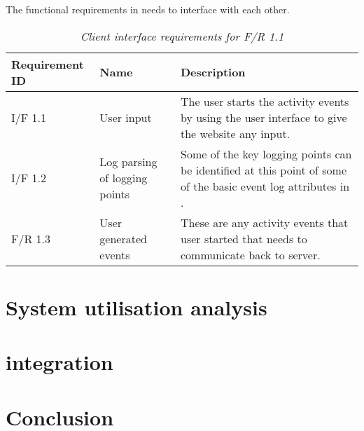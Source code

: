 The functional requirements in  needs to interface with each other.

\begin{table}[!htb]
	\centering
	\small
	\caption[Client interface requirements]
	{\textit{Client interface requirements for F/R 1.1}}
	\label{tbl:Ch2_Client_Interface_Requirements}
	\begin{tabularx}{\textwidth}{|l|l|X|}
		\hline \textbf{Requirement ID} & \textbf{Name} & \textbf{Description} \\
		\hline I/F 1.1 & User input & The user starts the activity events by using the user interface to give the website any input.\\
		\hline I/F 1.2 & Log parsing of logging points & Some of the key logging points can be identified at this point of some of the basic event log attributes in \Cref{tbl:CH1_Log_Basic_Attributes}.\\
		\hline F/R 1.3 & User generated events & These are any activity events that user started that needs to communicate back to server.\\
		\hline
	\end{tabularx}
\end{table}

\section{System utilisation analysis}

\section{integration}

\section{Conclusion}